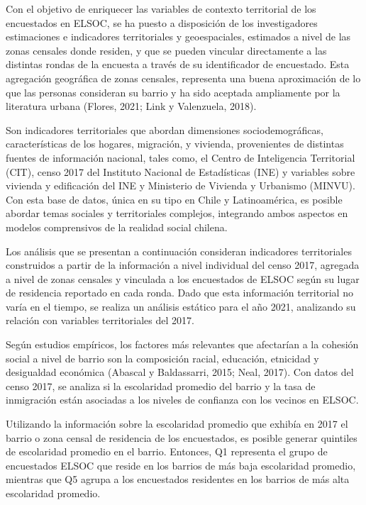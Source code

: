 \documentclass[
  12pt,
]{book}
\begin{document}
Con el objetivo de enriquecer las variables de contexto territorial de los encuestados en ELSOC, se ha puesto a disposición de los investigadores estimaciones e indicadores territoriales y geoespaciales, estimados a nivel de las zonas censales donde residen, y que se pueden vincular directamente a las distintas rondas de la encuesta a través de su identificador de encuestado. Esta agregación geográfica de zonas censales, representa una buena aproximación de lo que las personas consideran su barrio y ha sido aceptada ampliamente por la literatura urbana (Flores, 2021; Link y Valenzuela, 2018).

Son indicadores territoriales que abordan dimensiones sociodemográficas, características de los hogares, migración, y vivienda, provenientes de distintas fuentes de información nacional, tales como, el Centro de Inteligencia Territorial (CIT), censo 2017 del Instituto Nacional de Estadísticas (INE) y variables sobre vivienda y edificación del INE y Ministerio de Vivienda y Urbanismo (MINVU). Con esta base de datos, única en su tipo en Chile y Latinoamérica, es posible abordar temas sociales y territoriales complejos, integrando ambos aspectos en modelos comprensivos de la realidad social chilena.

Los análisis que se presentan a continuación consideran indicadores territoriales construidos a partir de la información a nivel individual del censo 2017, agregada a nivel de zonas censales y vinculada a los encuestados de ELSOC según su lugar de residencia reportado en cada ronda. Dado que esta información territorial no varía en el tiempo, se realiza un análisis estático para el año 2021, analizando su relación con variables territoriales del 2017.

Según estudios empíricos, los factores más relevantes que afectarían a la cohesión social a nivel de barrio son la composición racial, educación, etnicidad y desigualdad económica (Abascal y Baldassarri, 2015; Neal, 2017). Con datos del censo 2017, se analiza si la escolaridad promedio del barrio y la tasa de inmigración están asociadas a los niveles de confianza con los vecinos en ELSOC.

Utilizando la información sobre la escolaridad promedio que exhibía en 2017 el barrio o zona censal de residencia de los encuestados, es posible generar quintiles de escolaridad promedio en el barrio. Entonces, Q1 representa el grupo de encuestados ELSOC que reside en los barrios de más baja escolaridad promedio, mientras que Q5 agrupa a los encuestados residentes en los barrios de más alta escolaridad promedio.
\end{document}
